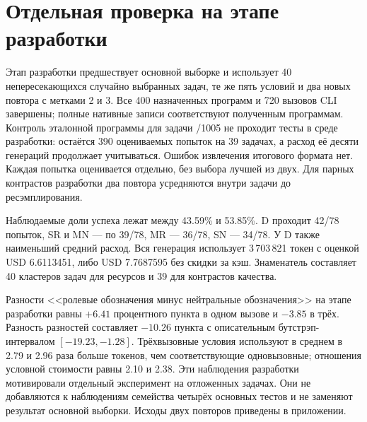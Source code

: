 \section{Отдельная проверка на этапе разработки}
\label{sec:dev40-results}
Этап разработки предшествует основной выборке и использует 40 непересекающихся случайно выбранных задач, те же пять условий и два новых повтора с метками 2 и 3. Все 400 назначенных программ и 720 вызовов CLI завершены; полные нативные записи соответствуют полученным программам. Контроль эталонной программы для задачи /1005 не проходит тесты в среде разработки: остаётся 390 оцениваемых попыток на 39 задачах, а расход её десяти генераций продолжает учитываться. Ошибок извлечения итогового формата нет. Каждая попытка оценивается отдельно, без выбора лучшей из двух. Для парных контрастов разработки два повтора усредняются внутри задачи до ресэмплирования.



Наблюдаемые доли успеха лежат между 43.59\% и 53.85\%. D проходит 42/78 попыток, SR и MN --- по 39/78, MR --- 36/78, SN --- 34/78. У D также наименьший средний расход. Вся генерация использует 3\,703\,821 токен с оценкой USD 6.6113451, либо USD 7.7687595 без скидки за кэш. Знаменатель составляет 40 кластеров задач для ресурсов и 39 для контрастов качества.



Разности <<ролевые обозначения минус нейтральные обозначения>> на этапе разработки равны $+6.41$ процентного пункта в одном вызове и $-3.85$ в трёх. Разность разностей составляет $-10.26$ пункта с описательным бутстрэп-интервалом $[-19.23,-1.28]$. Трёхвызовные условия используют в среднем в 2.79 и 2.96 раза больше токенов, чем соответствующие одновызовные; отношения условной стоимости равны 2.10 и 2.38. Эти наблюдения разработки мотивировали отдельный эксперимент на отложенных задачах. Они не добавляются к наблюдениям семейства четырёх основных тестов и не заменяют результат основной выборки. Исходы двух повторов приведены в приложении.
